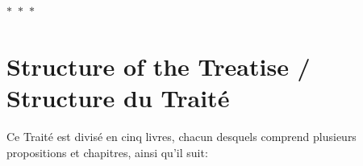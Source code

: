 \documentclass[11pt,a4paper]{article}
\theoremstyle{plain}
\theoremstyle{definition}
\theoremstyle{remark}
\newcommand{\ornament}{\begin{center}\textcolor{goldaccent}{$\ast$~$\ast$~$\ast$}\end{center}}
\begin{document}
\ornament






\section*{Structure of the Treatise / Structure du Traité}






Ce Traité est divisé en cinq livres, chacun desquels comprend plusieurs propositions et chapitres, ainsi qu'il suit:
\end{document}
